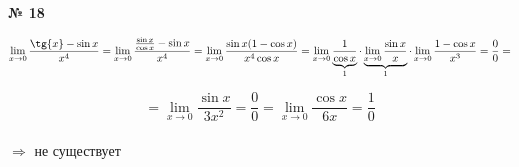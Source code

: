 \documentclass{article}
\begin{document}
\textbf{№ 18} 

$$ \lim\limits_{x\to 0} \frac{\tg{x}-\sin{x}}{x^4} 
= \lim\limits_{x\to 0} \frac{\frac{\sin{x}}{\cos{x}}-\sin{x}}{x^4} 
= \lim\limits_{x\to 0} \frac{\sin{x}(1-\cos{x})}{x^4\cos{x}}
= \lim\limits_{x\to 0} \underbrace{\frac{1}{\cos{x}}}_{1} \cdot \underbrace{\lim\limits_{x\to 0} \frac{\sin{x}}{x}}_{1} \cdot \lim\limits_{x\to 0} \frac{1-\cos{x}}{x^3}
= \frac{0}{0}
= $$

$$ = \lim\limits_{x\to 0} \frac{\sin{x}}{3x^2} 
= \frac{0}{0}
= \lim\limits_{x\to 0} \frac{\cos{x}}{6x} 
= \frac{1}{0} $$
\\
$ \Rightarrow $ не существует
\end{document}

